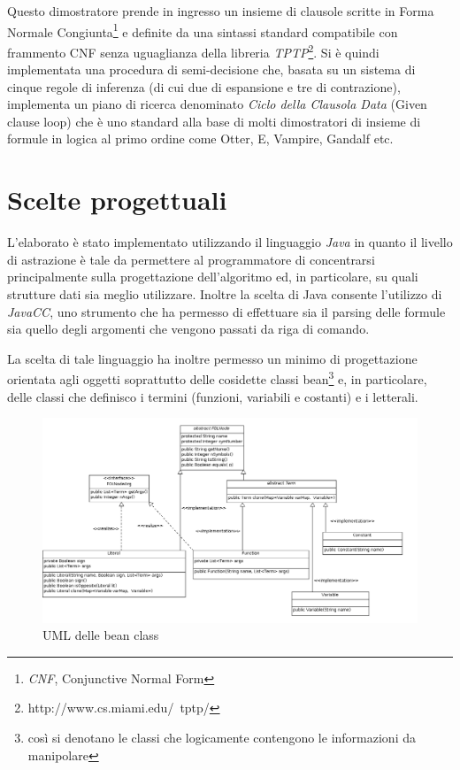 \documentclass[a4paper,11pt]{article}
\begin{document}
Questo dimostratore prende in ingresso un insieme di clausole scritte in Forma Normale Congiunta\footnote{\emph{CNF}, Conjunctive Normal Form} e definite da una sintassi standard compatibile con frammento CNF senza uguaglianza della libreria \emph{TPTP}\footnote{http://www.cs.miami.edu/~tptp/}. Si è quindi implementata una procedura di semi-decisione che, basata su un sistema di cinque regole di inferenza (di cui due di espansione e tre di contrazione), implementa un piano di ricerca denominato \emph{Ciclo della Clausola Data} (Given clause loop) che è uno standard alla base di molti dimostratori di insieme di formule in logica al primo ordine come Otter, E, Vampire, Gandalf etc.

\section{Scelte progettuali}
L'elaborato è stato implementato utilizzando il linguaggio \emph{Java} in quanto il livello di astrazione è tale da permettere al programmatore di concentrarsi principalmente sulla progettazione dell'algoritmo ed, in particolare, su quali strutture dati sia meglio utilizzare. 
Inoltre la scelta di Java consente l'utilizzo di \emph{JavaCC}, uno strumento che ha permesso di effettuare sia il parsing delle formule sia quello degli argomenti che vengono passati da riga di comando.\par
La scelta di tale linguaggio ha inoltre permesso un minimo di progettazione orientata agli oggetti soprattutto delle cosidette classi bean\footnote{così si denotano le classi che logicamente contengono le informazioni da manipolare} e, in particolare, delle classi che definisco i termini (funzioni, variabili e costanti) e i letterali.\par

\begin{figure}[h]
\includegraphics[width=1\columnwidth]{beanClassUML.png}
\caption{\small{UML delle bean class}}
\label{beanClassUML}
\end{figure}
\end{document}
